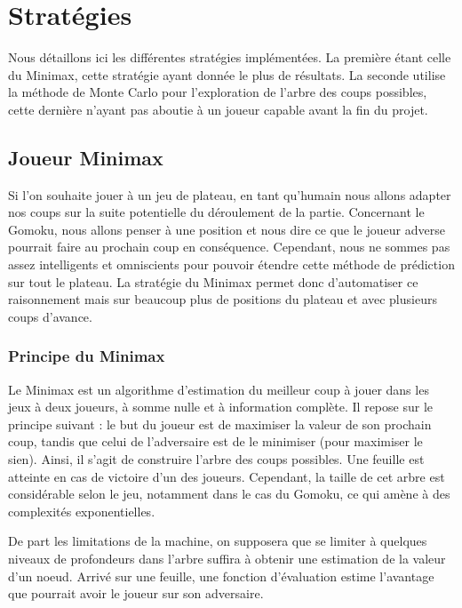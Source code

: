 \documentclass[a4paper,11pt]{article}
\begin{document}

\section{Stratégies}
\label{sct:strategies}

Nous détaillons ici les différentes stratégies implémentées. La première étant celle du Minimax, cette stratégie ayant donnée le plus de résultats. La seconde utilise la méthode de Monte Carlo pour l'exploration de l'arbre des coups possibles, cette dernière n'ayant pas aboutie à un joueur capable avant la fin du projet.


\subsection{Joueur Minimax}
\label{subsct:minimax}

Si l'on souhaite jouer à un jeu de plateau, en tant qu'humain nous allons adapter nos coups sur la suite potentielle du déroulement de la partie.
Concernant le Gomoku, nous allons penser à une position et nous dire ce que le joueur adverse pourrait faire au prochain coup en conséquence. Cependant, nous ne sommes pas assez intelligents et omniscients pour pouvoir étendre cette méthode de prédiction sur tout le plateau.
La stratégie du Minimax permet donc d'automatiser ce raisonnement mais sur beaucoup plus de positions du plateau et avec plusieurs coups d'avance.


\subsubsection{Principe du Minimax}
\label{subsct:principe_minimax}

Le Minimax est un algorithme d'estimation du meilleur coup à jouer dans les jeux à deux joueurs, à somme nulle et à information complète. Il repose sur le principe suivant : le but du joueur est de maximiser la valeur de son prochain coup, tandis que celui de l'adversaire est de le minimiser (pour maximiser le sien). Ainsi, il s'agit de construire l'arbre des coups possibles.
Une feuille est atteinte en cas de victoire d'un des joueurs. Cependant, la taille de cet arbre est considérable selon le jeu, notamment dans le cas du Gomoku, ce qui amène à des complexités exponentielles.

De part les limitations de la machine, on supposera que se limiter à quelques niveaux de profondeurs dans l'arbre suffira à obtenir une estimation de la valeur d'un noeud. Arrivé sur une feuille, une fonction d'évaluation estime l'avantage que pourrait avoir le joueur sur son adversaire.
\end{document}

